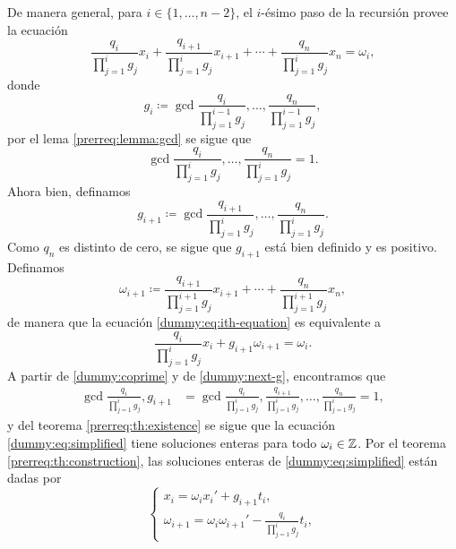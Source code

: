 De manera general, para $i \in \lbrace 1, \ldots, n - 2 \rbrace$, el $i$-ésimo paso de la recursión
provee la ecuación
\begin{equation}
	\label{dummy:eq:ith-equation}
	\frac{q_i}{\prod_{j=1}^{i}g_j}x_i
	+ \frac{q_{i+1}}{\prod_{j=1}^{i}g_j}x_{i+1}
	+ \cdots
	+ \frac{q_{n}}{\prod_{j=1}^{i}g_j}x_n
	= \omega_i,
\end{equation}
donde
\begin{equation}
	\label{dummy:eq:ith-g}
	g_i \coloneq \gcd{\frac{q_i}{\prod_{j=1}^{i-1}g_j}, \ldots, \frac{q_n}{\prod_{j=1}^{i-1}g_j}},
\end{equation}
por el lema \ref{prerreq:lemma:gcd} se sigue que
\begin{equation}
	\label{dummy:coprime}
	\gcd{\frac{q_i}{\prod_{j=1}^{i}g_j}, \ldots, \frac{q_n}{\prod_{j=1}^{i}g_j}} = 1.
\end{equation}
Ahora bien, definamos
\begin{equation}
	\label{dummy:next-g}
	g_{i + 1} \coloneq \gcd{
		\frac{q_{i+1}}{\prod_{j=1}^{i}g_j},
		\ldots,
		\frac{q_{n}}{\prod_{j=1}^{i}g_j}
	}.
\end{equation}
Como $q_n$ es distinto de cero, se sigue que $g_{i + 1}$ está bien definido y es positivo.
Definamos
\begin{equation*}
	\omega_{i+1} \coloneq
	\frac{q_{i+1}}{\prod_{j=1}^{i + 1}g_j}x_{i+1}
	+ \cdots +
	\frac{q_{n}}{\prod_{j=1}^{i + 1}g_j}x_{n},
\end{equation*}
de manera que la ecuación \eqref{dummy:eq:ith-equation} es equivalente a
\begin{equation}
	\label{dummy:eq:simplified}
	\frac{q_i}{\prod_{j=1}^{i}g_j}x_i + g_{i+1}\omega_{i+1} = \omega_i.
\end{equation}
A partir de \eqref{dummy:coprime} y de \eqref{dummy:next-g}, encontramos que
\begin{align*}
	\gcd{
		\frac{q_i}{\prod_{j=1}^{i}g_j},
		g_{i+1}
	}
	&=
	\gcd{
		\frac{q_i}{\prod_{j=1}^{i}g_j},
		\frac{q_{i+1}}{\prod_{j=1}^{i}g_j},
		\ldots,
		\frac{q_n}{\prod_{j=1}^{i}g_j}
	} = 1,
\end{align*}
y del teorema \ref{prerreq:th:existence} se sigue que la ecuación \eqref{dummy:eq:simplified}
tiene soluciones enteras para todo $\omega_i \in \mathbb{Z}$. Por el teorema \ref{prerreq:th:construction},
las soluciones enteras de \eqref{dummy:eq:simplified} están dadas por
\begin{equation}
	\label{eq:recurrence}
	\begin{cases}
		x_i = \omega_ix_i' + g_{i + 1}t_i, \\
		\omega_{i + 1} = \omega_i\omega_{i + 1}' - \frac{q_i}{\prod_{j=1}^{i}g_j}t_i,
	\end{cases}
\end{equation}
